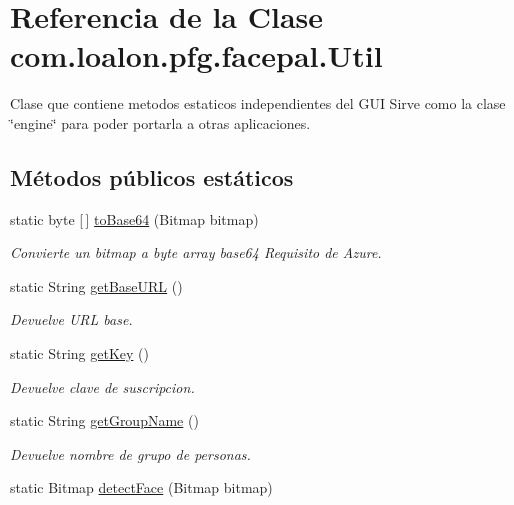\hypertarget{classcom_1_1loalon_1_1pfg_1_1facepal_1_1_util}{}\section{Referencia de la Clase com.\+loalon.\+pfg.\+facepal.\+Util}
\label{classcom_1_1loalon_1_1pfg_1_1facepal_1_1_util}


Clase que contiene metodos estaticos independientes del G\+UI Sirve como la clase \char`\"{}engine\char`\"{} para poder portarla a otras aplicaciones.  


\subsection*{Métodos públicos estáticos}
\begin{DoxyCompactItemize}
\item 
static byte \mbox{[}$\,$\mbox{]} \mbox{\hyperlink{classcom_1_1loalon_1_1pfg_1_1facepal_1_1_util_a363e942720417034c6c52fe4dd21df31}{to\+Base64}} (Bitmap bitmap)
\begin{DoxyCompactList}\small\item\em Convierte un bitmap a byte array base64 Requisito de Azure. \end{DoxyCompactList}\item 
static String \mbox{\hyperlink{classcom_1_1loalon_1_1pfg_1_1facepal_1_1_util_aa2f3ea68628c684b86868bf5d3a1cd5f}{get\+Base\+U\+RL}} ()
\begin{DoxyCompactList}\small\item\em Devuelve U\+RL base. \end{DoxyCompactList}\item 
static String \mbox{\hyperlink{classcom_1_1loalon_1_1pfg_1_1facepal_1_1_util_a537cee01d79a860eb281c942e97636eb}{get\+Key}} ()
\begin{DoxyCompactList}\small\item\em Devuelve clave de suscripcion. \end{DoxyCompactList}\item 
static String \mbox{\hyperlink{classcom_1_1loalon_1_1pfg_1_1facepal_1_1_util_a78dd2a2f40d6f82d71b7674ce40b46aa}{get\+Group\+Name}} ()
\begin{DoxyCompactList}\small\item\em Devuelve nombre de grupo de personas. \end{DoxyCompactList}\item 
static Bitmap \mbox{\hyperlink{classcom_1_1loalon_1_1pfg_1_1facepal_1_1_util_a57c1890189bffa4c69c51e286a2f6dbf}{detect\+Face}} (Bitmap bitmap)

\end{DoxyCompactItemize}
